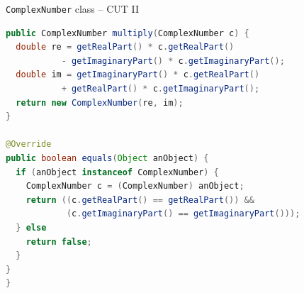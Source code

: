 \documentclass[11pt, xcolor=svgnames]{beamer}
\begin{document}

\begin{frame}[fragile]{\texttt{ComplexNumber} class -- CUT II}

\begin{lstlisting}[language=Java,basicstyle=\scriptsize]
public ComplexNumber multiply(ComplexNumber c) {
  double re = getRealPart() * c.getRealPart()
           - getImaginaryPart() * c.getImaginaryPart();
  double im = getImaginaryPart() * c.getRealPart()
           + getRealPart() * c.getImaginaryPart();
  return new ComplexNumber(re, im);
}

@Override
public boolean equals(Object anObject) {
  if (anObject instanceof ComplexNumber) {
    ComplexNumber c = (ComplexNumber) anObject;
    return ((c.getRealPart() == getRealPart()) &&
            (c.getImaginaryPart() == getImaginaryPart()));
  } else
    return false;
  }
}
}
\end{lstlisting}

\end{frame}








\end{document}
